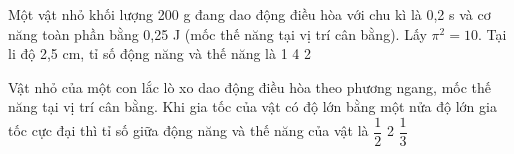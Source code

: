 

\begin{ex}%
Một vật nhỏ khối lượng 200 g đang dao động điều hòa với chu kì là 0,2 s và cơ năng toàn phần bằng 0,25 J (mốc thế năng tại vị trí cân bằng). Lấy $\pi^2 = 10$. Tại li độ 2,5 cm, tỉ số động năng và thế năng là
\choice
{1}
{4}
{}
{2}
\end{ex} 




\begin{ex}%
Vật nhỏ của một con lắc lò xo dao động điều hòa theo phương ngang, mốc thế năng tại vị trí cân bằng. Khi gia tốc của vật có độ lớn bằng một nửa độ lớn gia tốc cực đại thì tỉ số giữa động năng và thế năng của vật là
\choice
{$\dfrac{1}{2}$}
{}
{2}
{$\dfrac{1}{3}$}
\end{ex} 






